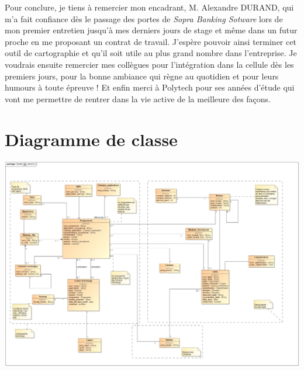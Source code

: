\documentclass{polytech/polytech}
\begin{document}
Pour conclure, je tiens à remercier mon encadrant, M. Alexandre DURAND, qui m'a fait confiance dès le passage des portes de \textit{Sopra Banking Sotware} lors de mon premier entretien jusqu'à mes derniers jours de stage et même dans un futur proche en me proposant un contrat de travail. J'espère pouvoir ainsi terminer cet outil de cartographie et qu'il soit utile au plus grand nombre dans l'entreprise. Je voudrais ensuite remercier mes collègues pour l'intégration dans la cellule dès les premiers jours, pour la bonne ambiance qui règne au quotidien et pour leurs humours à toute épreuve ! Et enfin merci à Polytech pour ses années d'étude qui vont me permettre de rentrer dans la vie active de la meilleure des façons.

\appendix

\chapter{Diagramme de classe}
\label{ann:diagClasse}

\begin{landscape}
	\includegraphics[scale=0.37]{images/CartoV3}
\end{landscape}
\end{document}

